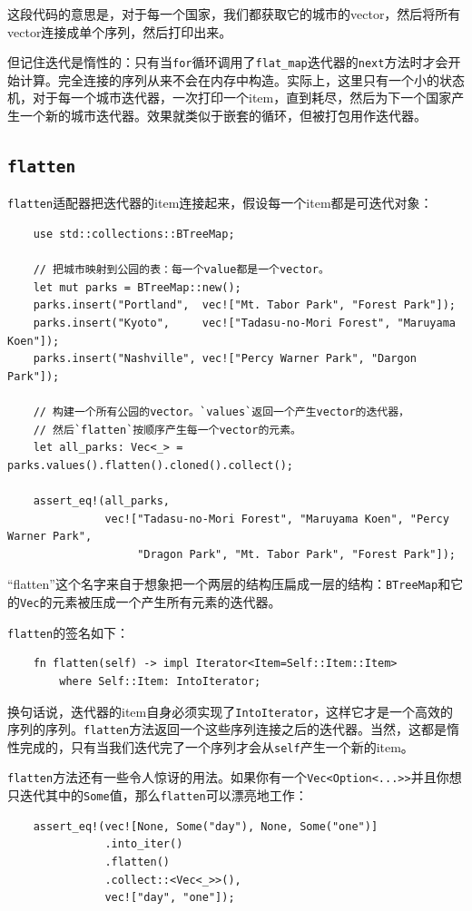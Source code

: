 这段代码的意思是，对于每一个国家，我们都获取它的城市的vector，然后将所有vector连接成单个序列，然后打印出来。

但记住迭代是惰性的：只有当\texttt{for}循环调用了\texttt{flat\_map}迭代器的\texttt{next}方法时才会开始计算。完全连接的序列从来不会在内存中构造。实际上，这里只有一个小的状态机，对于每一个城市迭代器，一次打印一个item，直到耗尽，然后为下一个国家产生一个新的城市迭代器。效果就类似于嵌套的循环，但被打包用作迭代器。

\subsection{\texttt{flatten}}
\texttt{flatten}适配器把迭代器的item连接起来，假设每一个item都是可迭代对象：
\begin{verbatim}
    use std::collections::BTreeMap;

    // 把城市映射到公园的表：每一个value都是一个vector。
    let mut parks = BTreeMap::new();
    parks.insert("Portland",  vec!["Mt. Tabor Park", "Forest Park"]);
    parks.insert("Kyoto",     vec!["Tadasu-no-Mori Forest", "Maruyama Koen"]);
    parks.insert("Nashville", vec!["Percy Warner Park", "Dargon Park"]);

    // 构建一个所有公园的vector。`values`返回一个产生vector的迭代器，
    // 然后`flatten`按顺序产生每一个vector的元素。
    let all_parks: Vec<_> = parks.values().flatten().cloned().collect();

    assert_eq!(all_parks,
               vec!["Tadasu-no-Mori Forest", "Maruyama Koen", "Percy Warner Park", 
                    "Dragon Park", "Mt. Tabor Park", "Forest Park"]);
\end{verbatim}

“flatten”这个名字来自于想象把一个两层的结构压扁成一层的结构：\texttt{BTreeMap}和它的\texttt{Vec}的元素被压成一个产生所有元素的迭代器。

\texttt{flatten}的签名如下：
\begin{verbatim}
    fn flatten(self) -> impl Iterator<Item=Self::Item::Item>
        where Self::Item: IntoIterator;
\end{verbatim}

换句话说，迭代器的item自身必须实现了\texttt{IntoIterator}，这样它才是一个高效的序列的序列。\texttt{flatten}方法返回一个这些序列连接之后的迭代器。当然，这都是惰性完成的，只有当我们迭代完了一个序列才会从\texttt{self}产生一个新的item。

\texttt{flatten}方法还有一些令人惊讶的用法。如果你有一个\texttt{Vec<Option<...>>}并且你想只迭代其中的\texttt{Some}值，那么\texttt{flatten}可以漂亮地工作：
\begin{verbatim}
    assert_eq!(vec![None, Some("day"), None, Some("one")]
               .into_iter()
               .flatten()
               .collect::<Vec<_>>(),
               vec!["day", "one"]);
\end{verbatim}

